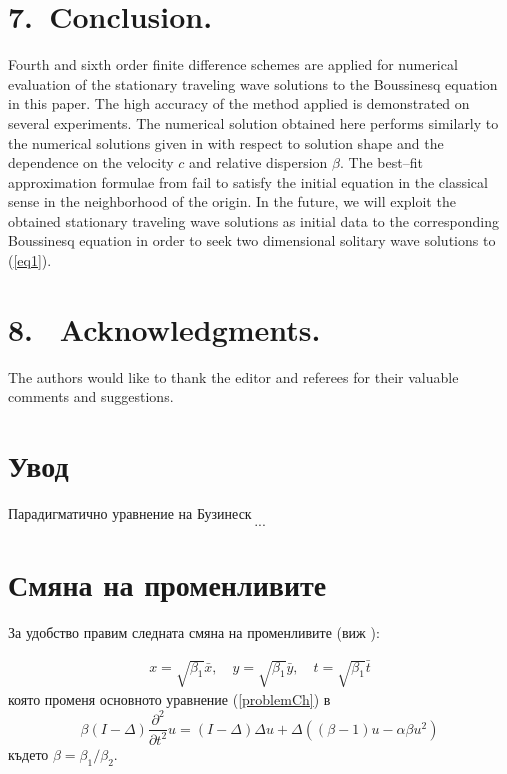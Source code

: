 \documentclass{article}
\newcommand{\be}{\begin{equation}}
\newcommand{\ee}{\end{equation}}
\newcommand{\rf}[1]{(\ref{#1})}
\begin{document}
\bigskip

\section{7.~Conclusion.}
Fourth and sixth order finite difference schemes are applied for numerical evaluation of the stationary traveling wave solutions to the Boussinesq equation in this paper. The high accuracy of the method applied is demonstrated on several experiments. The numerical solution obtained here performs similarly to the numerical solutions given in \cite{Ch2012,Ch2011} with respect to solution shape and the dependence on the velocity $c$ and relative dispersion $\beta$. 
The best--fit approximation formulae from  \cite{Ch2011} fail to satisfy the initial equation in the classical sense in the neighborhood of the origin. 
In the future, we will exploit the obtained stationary traveling wave solutions as initial data to the corresponding Boussinesq equation in order to seek two dimensional solitary wave solutions to \rf{eq1}.

\bigskip

\section{8.~ Acknowledgments.}

The authors would like to thank the editor and referees for their valuable comments and suggestions.





\section{Увод}
Парадигматично уравнение на Бузинеск
\be\label{problemCh}
...
\ee


\section{Смяна на променливите}

За удобство правим следната смяна на променливите (виж \cite{ref25}):

\begin{align}
x = \sqrt{\beta_1} \bar{x}, \quad y = \sqrt{\beta_1} \bar{y}, \quad t = \sqrt{\beta_1} \bar{t} \nonumber
\end{align}
която променя основното уравнение \rf{problemCh} в
\be\label{problemVC}
 \beta (I-\Delta) \frac{\partial^2}{\partial t^2}u= 
(I-\Delta)\Delta u +\Delta( (\beta - 1 )u - \alpha \beta u^2 )
\ee
където $\beta = \beta_1/\beta_2$. 
\end{document}
